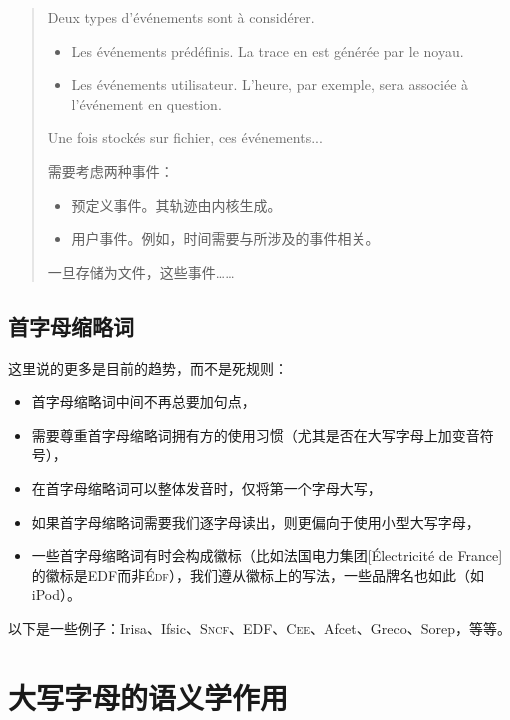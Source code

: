 \begin{quote}
    Deux types d’événements sont à considérer.
    \begin{itemize}
        \item Les événements prédéfinis. La trace en est générée par le noyau.
        \item Les événements utilisateur. L’heure, par exemple, sera associée à l’événement en question.
    \end{itemize}
    Une fois stockés sur fichier, ces événements...
    \begin{bil}
        需要考虑两种事件：
        \begin{itemize}
            \item 预定义事件。其轨迹由内核生成。
            \item 用户事件。例如，时间需要与所涉及的事件相关。
        \end{itemize}
        一旦存储为文件，这些事件……
    \end{bil}
\end{quote}

\subsection{首字母缩略词}

这里说的更多是目前的趋势，而不是死规则：

\begin{itemize}
    \item 首字母缩略词中间不再总要加句点，
    \item 需要尊重首字母缩略词拥有方的使用习惯（尤其是否在大写字母上加变音符号），
    \item 在首字母缩略词可以整体发音时，仅将第一个字母大写，
    \item 如果首字母缩略词需要我们逐字母读出，则更偏向于使用小型大写字母，
    \item 一些首字母缩略词有时会构成徽标（比如法国电力集团[Électricité de France]的徽标是EDF而非\textsc{Édf}），我们遵从徽标上的写法，一些品牌名也如此（如iPod）。
\end{itemize}

以下是一些例子：Irisa、Ifsic、\textsc{Sncf}、EDF、\textsc{Cee}、Afcet、Greco、Sorep，等等。

\section{大写字母的语义学作用}

